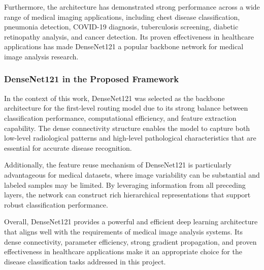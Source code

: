 Furthermore, the architecture has demonstrated strong performance across a wide range of medical imaging applications, including chest disease classification, pneumonia detection, COVID-19 diagnosis, tuberculosis screening, diabetic retinopathy analysis, and cancer detection. Its proven effectiveness in healthcare applications has made DenseNet121 a popular backbone network for medical image analysis research.

\subsubsection{DenseNet121 in the Proposed Framework}

In the context of this work, DenseNet121 was selected as the backbone architecture for the first-level routing model due to its strong balance between classification performance, computational efficiency, and feature extraction capability. The dense connectivity structure enables the model to capture both low-level radiological patterns and high-level pathological characteristics that are essential for accurate disease recognition.

Additionally, the feature reuse mechanism of DenseNet121 is particularly advantageous for medical datasets, where image variability can be substantial and labeled samples may be limited. By leveraging information from all preceding layers, the network can construct rich hierarchical representations that support robust classification performance.

Overall, DenseNet121 provides a powerful and efficient deep learning architecture that aligns well with the requirements of medical image analysis systems. Its dense connectivity, parameter efficiency, strong gradient propagation, and proven effectiveness in healthcare applications make it an appropriate choice for the disease classification tasks addressed in this project.
